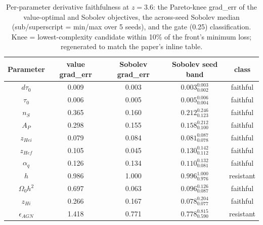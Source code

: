 \begin{table}[!ht]
\caption{\label{tab:taxonomy} Per-parameter derivative faithfulness at $z=3.6$: the Pareto-knee grad\_err of the value-optimal and Sobolev objectives, the across-seed Sobolev median (sub/superscript = min/max over 5 seeds), and the gate (0.25) classification. Knee = lowest-complexity candidate within 10\% of the front's minimum loss; regenerated to match the paper's inline table.}
\begin{ruledtabular}\centering
\begin{tabular}{c|cccc}
Parameter & value grad\_err & Sobolev grad\_err & Sobolev seed band & class \\
\hline
$d\tau_0$ & 0.009 & 0.003 & $0.003_{0.002}^{0.003}$ & faithful \\
$\tau_0$ & 0.006 & 0.005 & $0.005_{0.004}^{0.006}$ & faithful \\
$n_S$ & 0.365 & 0.160 & $0.212_{0.123}^{0.246}$ & faithful \\
$A_P$ & 0.298 & 0.155 & $0.158_{0.100}^{0.212}$ & faithful \\
$z_{Hei}$ & 0.079 & 0.084 & $0.081_{0.078}^{0.087}$ & faithful \\
$z_{Hef}$ & 0.105 & 0.045 & $0.130_{0.112}^{0.142}$ & faithful \\
$\alpha_q$ & 0.126 & 0.134 & $0.110_{0.081}^{0.132}$ & faithful \\
$h$ & 0.986 & 1.000 & $0.996_{0.976}^{1.000}$ & resistant \\
$\Omega_0 h^2$ & 0.697 & 0.063 & $0.096_{0.087}^{0.126}$ & faithful \\
$z_{Hi}$ & 0.266 & 0.167 & $0.078_{0.077}^{0.204}$ & faithful \\
$\epsilon_{AGN}$ & 1.418 & 0.771 & $0.778_{0.590}^{0.815}$ & resistant \\
\end{tabular}\end{ruledtabular}\end{table}
